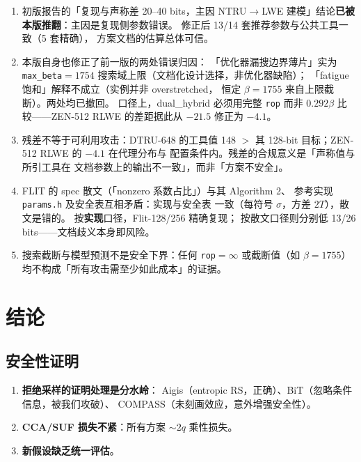 \documentclass[11pt,a4paper]{ctexart}
\begin{document}
\begin{warnbox}[诚实声明]
\begin{enumerate}
\item 初版报告的「复现与声称差 20--40 bits，主因 NTRU$\to$LWE
      建模」结论\textbf{已被本版推翻}：主因是复现侧参数错误。
      修正后 13/14 套推荐参数与公共工具一致（5 套精确），
      方案文档的估算总体可信。
\item 本版自身也修正了前一版的两处错误归因：
      「优化器漏搜边界薄片」实为 \texttt{max\_beta}$=1754$
      搜索域上限（文档化设计选择，非优化器缺陷）；
      「fatigue 饱和」解释不成立（实例并非 overstretched，
      恒定 $\beta{=}1755$ 来自上限截断）。两处均已撤回。
      口径上，dual\_hybrid 必须用完整 \texttt{rop} 而非
      $0.292\beta$ 比较——ZEN-512 RLWE 的差距据此从 $-21.5$
      修正为 $-4.1$。
\item 残差不等于可利用攻击：DTRU-648 的工具值 148 $>$ 其
      128-bit 目标；ZEN-512 RLWE 的 $-4.1$ 在代理分布与
      配置条件内。残差的合规意义是「声称值与所引工具在
      文档参数上的输出不一致」，而非「方案不安全」。
\item FLIT 的 spec 散文（「nonzero 系数占比」）与其 Algorithm 2、
      参考实现 \texttt{params.h} 及安全表互相矛盾：实现与安全表
      一致（每符号 $\sigma$，方差 $2T$），散文是错的。
      按\textbf{实现}口径，Flit-128/256 精确复现；
      按散文口径则分别低 13/26 bits——文档歧义本身即风险。
\item 搜索截断与模型预测不是安全下界：任何
      \texttt{rop}$=\infty$ 或截断值（如 $\beta{=}1755$）
      均不构成「所有攻击需至少如此成本」的证据。
\end{enumerate}
\end{warnbox}

\section{结论}

\subsection{安全性证明}

\begin{enumerate}
\item \textbf{拒绝采样的证明处理是分水岭}：
      Aigis（entropic RS，正确）、BiT（忽略条件信息，被我们攻破）、
      COMPASS（未刻画效应，意外增强安全性）。
\item \textbf{CCA/SUF 损失不紧}：所有方案 $\sim 2q$ 乘性损失。
\item \textbf{新假设缺乏统一评估}。
\end{enumerate}
\end{document}
